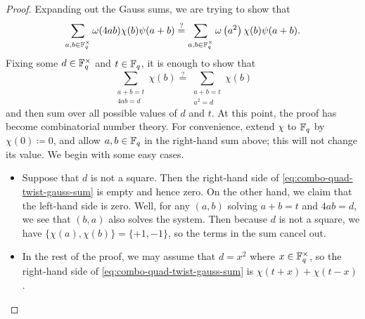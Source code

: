\begin{proof}
    Expanding out the Gauss sums, we are trying to show that
    \[\sum_{a,b\in\mathbb F_q^\times}\omega(4ab)\chi(b)\psi(a+b)\stackrel?=\sum_{a,b\in\mathbb F_q^\times}\omega\left(a^2\right)\chi(b)\psi(a+b).\]
    Fixing some $d\in\mathbb F_q^\times$ and $t\in\mathbb F_q$, it is enough to show that
    \begin{equation}
        \sum_{\substack{a+b=t\\4ab=d}}\chi(b) \stackrel?= \sum_{\substack{a+b=t\\a^2=d}}\chi(b) \label{eq:combo-quad-twist-gauss-sum}
    \end{equation}
    and then sum over all possible values of $d$ and $t$. At this point, the proof has become combinatorial number theory. For convenience, extend $\chi$ to $\mathbb F_q$ by $\chi(0)\coloneqq0$, and allow $a,b\in\mathbb F_q$ in the right-hand sum above; this will not change its value. We begin with some easy cases.
    \begin{itemize}
        \item Suppose that $d$ is not a square. Then the right-hand side of \eqref{eq:combo-quad-twist-gauss-sum} is empty and hence zero. On the other hand, we claim that the left-hand side is zero. Well, for any $(a,b)$ solving $a+b=t$ and $4ab=d$, we see that $(b,a)$ also solves the system. Then because $d$ is not a square, we have $\{\chi(a),\chi(b)\}=\{+1,-1\}$, so the terms in the sum cancel out.
        \item In the rest of the proof, we may assume that $d=x^2$ where $x\in\mathbb F_q^\times$, so the right-hand side of \eqref{eq:combo-quad-twist-gauss-sum} is $\chi(t+x)+\chi(t-x)$.
        

\end{itemize}
\end{proof}
